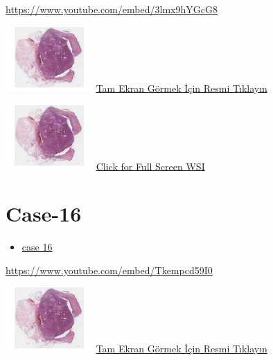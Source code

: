 \documentclass[
  letterpaper,
  paper=6in:9in,
  pagesize=pdftex,
  headinclude=on,
  footinclude=on,
  12pt]{scrbook}
\providecommand{\tightlist}{%
  \setlength{\itemsep}{0pt}\setlength{\parskip}{0pt}}\usepackage{longtable,booktabs,array}
\begin{document}
\url{https://www.youtube.com/embed/3lmx9hYGcG8}

\href{https://images.patolojiatlasi.com/hacettepe-com-case-1/HE.html}{\includegraphics[width=0.25\textwidth,height=\textheight]{./screenshots/hacettepe-com-case-1_screenshot.png}}
\href{https://images.patolojiatlasi.com/hacettepe-com-case-/HE.html}{Tam
Ekran Görmek İçin Resmi Tıklayın}

\href{https://images.patolojiatlasi.com/hacettepe-com-case-1/HE.html}{\includegraphics[width=0.25\textwidth,height=\textheight]{./screenshots/hacettepe-com-case-1_screenshot.png}}
\href{https://images.patolojiatlasi.com/hacettepe-com-case-/HE.html}{Click
for Full Screen WSI}

\hypertarget{sec-hacettepe-case-of-the-month-case-16}{%
\section{Case-16}\label{sec-hacettepe-case-of-the-month-case-16}}

\begin{itemize}
\tightlist
\item
  \href{https://www.youtube.com/watch?v=Tkempcd59I0\&ab_channel=KemalKosemehmetoglu}{case
  16}
\end{itemize}

\url{https://www.youtube.com/embed/Tkempcd59I0}

\href{https://images.patolojiatlasi.com/hacettepe-com-case-1/HE.html}{\includegraphics[width=0.25\textwidth,height=\textheight]{./screenshots/hacettepe-com-case-1_screenshot.png}}
\href{https://images.patolojiatlasi.com/hacettepe-com-case-/HE.html}{Tam
Ekran Görmek İçin Resmi Tıklayın}
\end{document}
